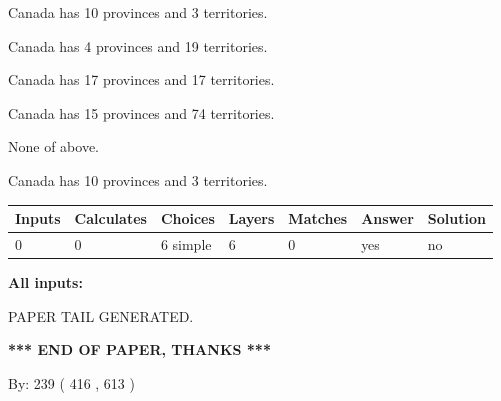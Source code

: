 \documentclass[12pt]{article}
\begin{document}
 
Canada has 10  provinces and 3 territories.
 
 
Canada has   4 provinces and  19 territories.
 
 
Canada has  17 provinces and  17 territories.
 
 
Canada has  15 provinces and  74 territories.
 
 
 None of above.
 
 
\noindent{}
 
 
Canada has 10  provinces and 3 territories.
 
 
\noindent{}
 
 
   
   
   
   
\noindent\begin{tabular}{|l|l|l|l|l|l|l|}
 \hline
Inputs & Calculates & Choices & Layers & Matches & Answer & Solution \\ \hline
 0  & 
 0  & 
 6
  simple  
  & 
 6  & 
 0  & 
  yes & 
  no 
  \\ \hline
 \end{tabular}
   
   
   
   
\noindent{}
   
   
   
   
\noindent\vspace{0.1in}\hspace{-0.08in} {\textbf{\Large{All inputs: }}}
   
   
   
   
   
   
 \vspace{0.2in}
 
   
   
\vspace{2.0in} PAPER TAIL GENERATED.
   
   
   
   
\vspace{1.0in} 
{\textbf{\large{ *** END OF PAPER, THANKS *** }}} 
   
   
\hspace{1.0in} By: 
 239 ( 416 ,  613 )
   
\end{document}
